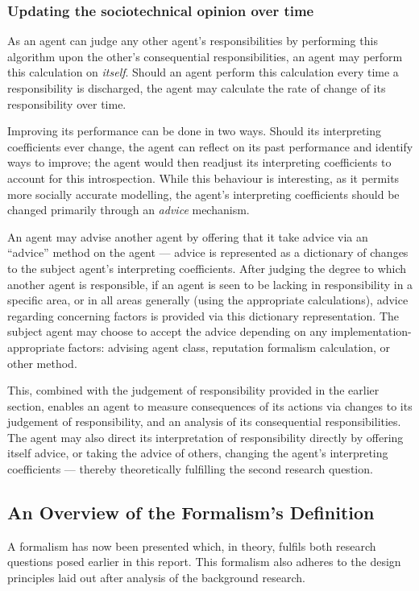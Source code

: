 \subsubsection{Updating the sociotechnical opinion over time}
As an agent can judge any other agent's responsibilities by performing this algorithm upon the other's consequential responsibilities, an agent may perform this calculation on \emph{itself}. Should an agent perform this calculation every time a responsibility is discharged, the agent may calculate the rate of change of its responsibility over time.\par

Improving its performance can be done in two ways. Should its interpreting coefficients ever change, the agent can reflect on its past performance and identify ways to improve; the agent would then readjust its interpreting coefficients to account for this introspection. While this behaviour is interesting, as it permits more socially accurate modelling, the agent's interpreting coefficients should be changed primarily through an \emph{advice} mechanism.\par

An agent may advise another agent by offering that it take advice via an ``advice'' method on the agent --- advice is represented as a dictionary of changes to the subject agent's interpreting coefficients. After judging the degree to which another agent is responsible, if an agent is seen to be lacking in responsibility in a specific area, or in all areas generally (using the appropriate calculations), advice regarding concerning factors is provided via this dictionary representation. The subject agent may choose to accept the advice depending on any implementation-appropriate factors: advising agent class, reputation formalism calculation, or other method.\par

This, combined with the judgement of responsibility provided in the earlier section, enables an agent to measure consequences of its actions via changes to its judgement of responsibility, and an analysis of its consequential responsibilities. The agent may also direct its interpretation of responsibility directly by offering itself advice, or taking the advice of others, changing the agent's interpreting coefficients --- thereby theoretically fulfilling the second research question.\par

\subsection{An Overview of the Formalism's Definition}
A formalism has now been presented which, in theory, fulfils both research questions posed earlier in this report. This formalism also adheres to the design principles laid out after analysis of the background research.\par

